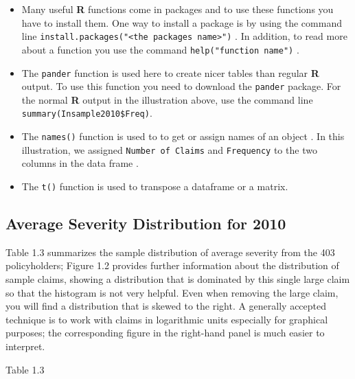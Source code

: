 \documentclass[]{book}
\newenvironment{Shaded}{\begin{snugshade}}{\end{snugshade}}
\newcommand{\KeywordTok}[1]{\textcolor[rgb]{0.13,0.29,0.53}{\textbf{#1}}}
\newcommand{\DecValTok}[1]{\textcolor[rgb]{0.00,0.00,0.81}{#1}}
\newcommand{\StringTok}[1]{\textcolor[rgb]{0.31,0.60,0.02}{#1}}
\newcommand{\OperatorTok}[1]{\textcolor[rgb]{0.81,0.36,0.00}{\textbf{#1}}}
\newcommand{\NormalTok}[1]{#1}
\theoremstyle{definition}
\theoremstyle{definition}
\theoremstyle{definition}
\theoremstyle{remark}
\begin{document}
\begin{itemize}
\item
  Many useful \textbf{R} functions come in packages and to use these
  functions you have to install them. One way to install a package is by
  using the command line
  \texttt{install.packages("\textless{}the\ package\textquotesingle{}s\ name\textgreater{}")}
  . In addition, to read more about a function you use the command
  \texttt{help("function\ name")} .
\item
  The \texttt{pander} function is used here to create nicer tables than
  regular \textbf{R} output. To use this function you need to download
  the \texttt{pander} package. For the normal \textbf{R} output in the
  illustration above, use the command line
  \texttt{summary(Insample2010\$Freq)}.
\item
  The \texttt{names()} function is used to to get or assign names of an
  object . In this illustration, we assigned \texttt{Number\ of\ Claims}
  and \texttt{Frequency} to the two columns in the data frame .
\item
  The \texttt{t()} function is used to transpose a dataframe or a
  matrix.
\end{itemize}

\subsection{Average Severity Distribution for
2010}\label{average-severity-distribution-for-2010}

Table 1.3 summarizes the sample distribution of average severity from
the 403 policyholders; Figure 1.2 provides further information about the
distribution of sample claims, showing a distribution that is dominated
by this single large claim so that the histogram is not very helpful.
Even when removing the large claim, you will find a distribution that is
skewed to the right. A generally accepted technique is to work with
claims in logarithmic units especially for graphical purposes; the
corresponding figure in the right-hand panel is much easier to
interpret.

Table 1.3

\begin{Shaded}
\end{Shaded}
\end{document}
